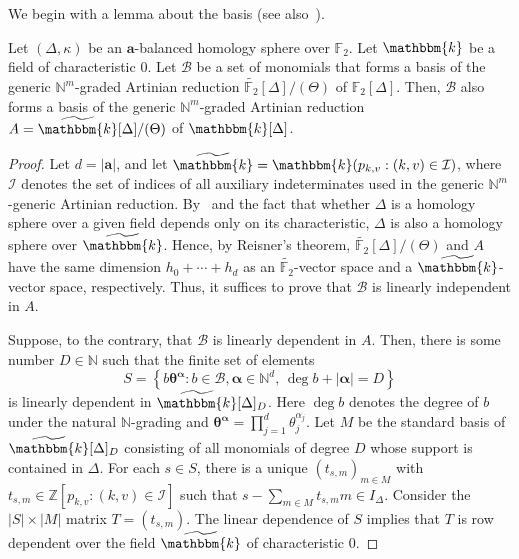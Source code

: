 We begin with a lemma about the basis (see also~\cite[Lemma 5.1]{KX}).
\begin{lemma} \label{lem:basis}
Let $(\Delta,\kappa)$ be an $\bm{a}$-balanced homology sphere over $\mathbb{F}_2$. 
Let $\mathbbm{k}$ be a field of characteristic $0$.
Let $\mathcal{B}$ be a set of monomials that forms a basis of the generic $\mathbb{N}^m$-graded Artinian reduction $\widetilde{\mathbb{F}_2}[\Delta]/(\Theta)$ of $\mathbb{F}_2[\Delta]$.
Then, $\mathcal{B}$ also forms a basis of the generic $\mathbb{N}^m$-graded Artinian reduction $A=\widetilde{\mathbbm{k}}[\Delta]/(\Theta)$ of $\mathbbm{k}[\Delta]$.
\end{lemma}
\begin{proof}
Let $d=|\bm{a}|$, and let $\widetilde{\mathbbm{k}}=\mathbbm{k}(p_{k,v}:(k,v) \in \mathcal{I})$, where $\mathcal{I}$ denotes the set of indices of all auxiliary indeterminates used in the generic $\mathbb{N}^m$-generic Artinian reduction.
By~\cite[Lemma 2.1 (2)]{KX} and the fact that whether $\Delta$ is a homology sphere over a given field depends only on its characteristic, $\Delta$ is also a homology sphere over $\widetilde{\mathbbm{k}}$.
Hence, by Reisner's theorem, $\widetilde{\mathbb{F}_2}[\Delta]/(\Theta)$ and $A$ have the same dimension $h_0+\cdots+h_d$ as an $\widetilde{\mathbb{F}_2}$-vector space and a $\widetilde{\mathbbm{k}}$-vector space, respectively.
Thus, it suffices to prove that $\mathcal{B}$ is linearly independent in $A$.

Suppose, to the contrary, that $\mathcal{B}$ is linearly dependent in $A$.
Then, there is some number $D \in \mathbb{N}$ such that the finite set of elements
\begin{equation*}
S=\left\{b \bm{\theta}^{\bm{\alpha}}:b \in \mathcal{B}, \bm{\alpha} \in \mathbb{N}^d, \, \deg b + |\bm{\alpha}|=D \right\}
\end{equation*}
is linearly dependent in $\widetilde{\mathbbm{k}}[\Delta]_D$. Here $\deg b$ denotes the degree of $b$ under the natural $\mathbb{N}$-grading and $\bm{\theta}^{\bm{\alpha}} = \prod_{j=1}^d \theta_j^{\alpha_j}$.
Let $M$ be the standard basis of $\widetilde{\mathbbm{k}}[\Delta]_D$ consisting of all monomials of degree $D$ whose support is contained in $\Delta$. 
For each $s \in S$, there is a unique $(t_{s,m})_{m \in M}$ with $t_{s,m} \in \mathbb{Z}[p_{k,v}:(k,v) \in \mathcal{I}]$ such that $s - \sum_{m \in M} t_{s,m} m \in I_{\Delta}$.
Consider the $|S| \times |M|$ matrix $T=(t_{s,m})$.
The linear dependence of $S$ implies that $T$ is row dependent over the field $\widetilde{\mathbbm{k}}$ of characteristic $0$.


\end{proof}
